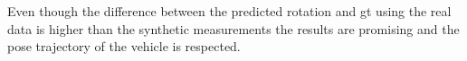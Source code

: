 Even though the difference between the predicted rotation and \gls{gt} using the
real data is higher than the synthetic measurements the results are
promising and the pose trajectory of the vehicle is respected.











